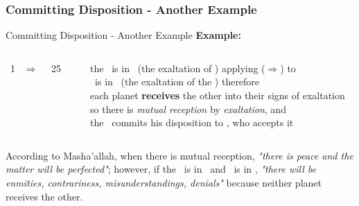 \subsubsection{Committing Disposition - Another Example}
\begin{frame}[t]{Committing Disposition - Another Example}
\textbf{Example:}\footnotemark[1]
\begin{columns}[T, onlytextwidth]
\Sun\ 1 \Libra\ $\Rightarrow$ \Opposition\ \Saturn\ 25 \Aries

\rule{.1mm}{.25\textheight}

the \Sun\ is in \Libra\ (the exaltation of \Saturn) applying ($\Rightarrow$) to \Opposition\ \Saturn \\
\Saturn\ is in \Aries\ (the exaltation of the \Sun) therefore \\
each planet \textbf{receives} the other into their signs of exaltation \\
so there is \textsl{mutual reception} by \textsl{exaltation}, and \\
the \Sun\ commits his disposition to \Saturn, who accepts it
\end{columns}
\vspace{0.25cm}
According to Masha'allah, when there is mutual reception, \textsl{"there is peace and the matter will be perfected"}; however, if the \Sun\ is in \Aries\ and \Saturn\ is in \Libra, \textsl{"there will be enmities, contrariness, misunderstandings, denials"} because neither planet receives the other.

\end{frame}
